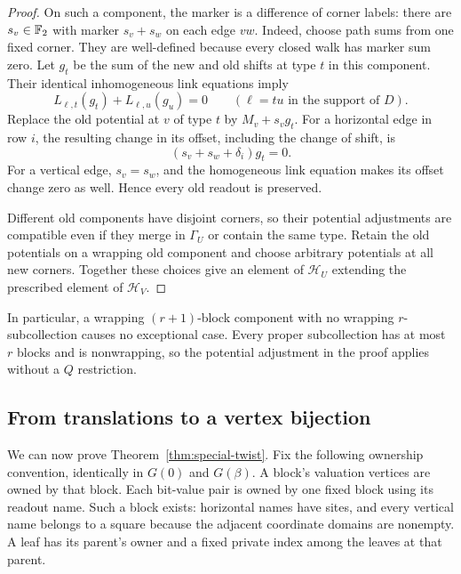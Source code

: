 \begin{proof}
On such a component, the marker is a difference of corner labels:
there are $s_v\in\mathbb F_2$ with marker $s_v+s_w$ on each edge $vw$.
Indeed, choose path sums from one fixed corner. They are well-defined
because every closed walk has marker sum zero. Let $g_t$ be the sum of
the new and old shifts at type $t$ in this component. Their identical
inhomogeneous link equations imply
\[
  L_{\ell,t}(g_t)+L_{\ell,u}(g_u)=0
  \qquad(\ell=tu\text{ in the support of }D).
\]
Replace the old potential at $v$ of type $t$ by $M_v+s_vg_t$.
For a horizontal edge in row $i$, the resulting change in its offset,
including the change of shift, is
\[
  (s_v+s_w+\delta_i)g_t=0.
\]
For a vertical edge, $s_v=s_w$, and the homogeneous link equation makes
its offset change zero as well. Hence every old readout is preserved.

Different old components have disjoint corners, so their potential
adjustments are compatible even if they merge in $\Gamma_U$ or contain
the same type. Retain the old potentials on a wrapping old component
and choose arbitrary potentials at all new corners. Together these
choices give an element of $\mathcal H_U$ extending the prescribed
element of $\mathcal H_V$.
\end{proof}

In particular, a wrapping $(r+1)$-block component with no wrapping
$r$-subcollection causes no exceptional case. Every proper subcollection
has at most $r$ blocks and is nonwrapping, so the potential adjustment
in the proof applies without a $Q$ restriction.

\subsection{From translations to a vertex bijection}

We can now prove Theorem~\ref{thm:special-twist}. Fix the following
ownership convention, identically in $G(0)$ and $G(\beta)$. A block's
valuation vertices are owned by that block. Each bit-value pair is
owned by one fixed block using its readout name. Such a block exists:
horizontal names have sites, and every vertical name belongs to a
square because the adjacent coordinate domains are nonempty. A leaf
has its parent's owner and a fixed private index among the leaves at
that parent.

